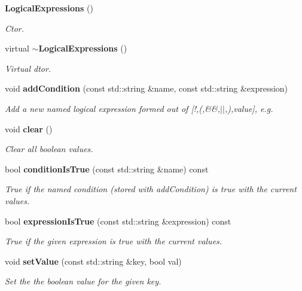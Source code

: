 \begin{DoxyCompactItemize}
\item 
\mbox{\label{classmarlin_1_1LogicalExpressions_aaf6b1462bb3a34629cfd9db2c6726731}} 
\textbf{ Logical\+Expressions} ()
\begin{DoxyCompactList}\small\item\em C\textquotesingle{}tor. \end{DoxyCompactList}\item 
virtual \textbf{ $\sim$\+Logical\+Expressions} ()
\begin{DoxyCompactList}\small\item\em Virtual d\textquotesingle{}tor. \end{DoxyCompactList}\item 
void \textbf{ add\+Condition} (const std\+::string \&name, const std\+::string \&expression)
\begin{DoxyCompactList}\small\item\em Add a new named logical expression formed out of [!,(,\&\&,$\vert$$\vert$,),value], e.\+g. \end{DoxyCompactList}\item 
\mbox{\label{classmarlin_1_1LogicalExpressions_a76b54f707451b712c17e28c9437046d3}} 
void \textbf{ clear} ()
\begin{DoxyCompactList}\small\item\em Clear all boolean values. \end{DoxyCompactList}\item 
\mbox{\label{classmarlin_1_1LogicalExpressions_a53954733e35a85e4dae0a9e2edd6288d}} 
bool \textbf{ condition\+Is\+True} (const std\+::string \&name) const
\begin{DoxyCompactList}\small\item\em True if the named condition (stored with add\+Condition) is true with the current values. \end{DoxyCompactList}\item 
\mbox{\label{classmarlin_1_1LogicalExpressions_a44e6f11745c32a5d27dedc1d728552e9}} 
bool \textbf{ expression\+Is\+True} (const std\+::string \&expression) const
\begin{DoxyCompactList}\small\item\em True if the given expression is true with the current values. \end{DoxyCompactList}\item 
\mbox{\label{classmarlin_1_1LogicalExpressions_ada41b5ce342ece132a711786fb4ca6d4}} 
void \textbf{ set\+Value} (const std\+::string \&key, bool val)
\begin{DoxyCompactList}\small\item\em Set the the boolean value for the given key. \end{DoxyCompactList}\end{DoxyCompactItemize}

